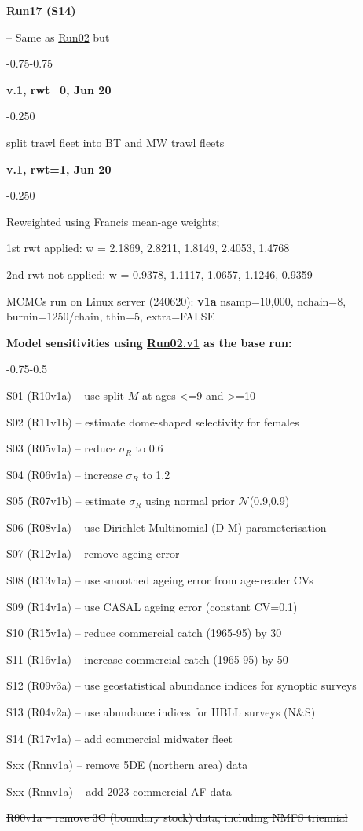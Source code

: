 \hypertarget{R17}{\textbf{Run17 (S14)}} -- Same as \hyperlink{R02}{Run02} but
\begin{itemize_csas}{-0.75}{-0.75}
	\item \textbf{v.1, rwt=0, Jun 20}
	\begin{itemize_csas}{-0.25}{0}
		\item split trawl fleet into BT and MW trawl fleets
	\end{itemize_csas}
	\item \textbf{v.1, rwt=1, Jun 20}
	\begin{itemize_csas}{-0.25}{0}
		\item Reweighted using Francis mean-age weights;
		\item 1st rwt applied: w = 2.1869, 2.8211, 1.8149, 2.4053, 1.4768
		\item 2nd rwt not applied: w = 0.9378, 1.1117, 1.0657, 1.1246, 0.9359
		\item MCMCs run on Linux server (240620): \textbf{v1a} nsamp=10,000, nchain=8, burnin=1250/chain, thin=5, extra=FALSE
	\end{itemize_csas}
\end{itemize_csas}


\textbf{Model sensitivities using \hyperlink{R02}{Run02.v1} as the base run:}
\begin{enumerate_csas}{-0.75}{-0.5}
	\item S01 (R10v1a) -- use split-$M$ at ages <=9 and >=10
	\item S02 (R11v1b) -- estimate dome-shaped selectivity for females
	\item S03 (R05v1a) -- reduce $\sigma_R$ to 0.6
	\item S04 (R06v1a) -- increase $\sigma_R$ to 1.2
	\item S05 (R07v1b) -- estimate $\sigma_R$ using normal prior $\mathcal{N}$(0.9,0.9)
	\item S06 (R08v1a) -- use Dirichlet-Multinomial (D-M) parameterisation
	\item S07 (R12v1a) -- remove ageing error
	\item S08 (R13v1a) -- use smoothed ageing error from age-reader CVs
	\item S09 (R14v1a) -- use CASAL ageing error (constant CV=0.1)
	\item S10 (R15v1a) -- reduce commercial catch (1965-95) by 30\pc{}
	\item S11 (R16v1a) -- increase commercial catch (1965-95) by 50\pc{}
	\item S12 (R09v3a) -- use geostatistical abundance indices for synoptic surveys
	\item S13 (R04v2a) -- use abundance indices for HBLL surveys (N\&S)
	\item S14 (R17v1a) -- add commercial midwater fleet
	\item Sxx (Rnnv1a) -- remove 5DE (northern area) data
	\item Sxx (Rnnv1a) -- add 2023 commercial AF data
	\item \st{R00v1a -- remove 3C (boundary stock) data, including NMFS triennial}
\end{enumerate_csas}
